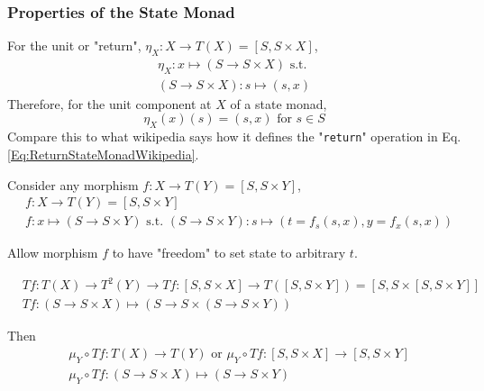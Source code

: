 \documentclass[10pt]{amsart}
\begin{document}
\begin{multicols*}{2}
\subsubsection{Properties of the State Monad}

For the unit or "return", $\eta_X : X \to T(X) = [S, S \times X]$, \\
\begin{equation}
\begin{gathered} 
\eta_X : x \mapsto (S \to S \times X) \text{ s.t. } \\
(S \to S \times X) : s \mapsto (s, x)
\end{gathered} 
\end{equation}
Therefore, for the unit component at $X$ of a state monad,
\begin{equation}
\boxed{ \eta_X(x)(s) = (s, x) \text{ for } s \in S }
\end{equation}
Compare this to what wikipedia says how it defines the "\texttt{return}" operation in Eq. \ref{Eq:ReturnStateMonadWikipedia}.

Consider any morphism $f : X \to T(Y) = [S, S\times Y]$,
\begin{equation}
\begin{aligned}
& f : X \to T(Y) = [S, S\times Y] \\
& f:x \mapsto (S \to S\times Y) \text{ s.t. } (S \to S \times Y) : s \mapsto (t = f_s(s, x), y = f_x(s, x))
\end{aligned}
\end{equation}

Allow morphism $f$ to have "freedom" to set state to arbitrary $t$.

\begin{equation}
\begin{aligned}
& Tf:T(X) \to T^2(Y) \to Tf : [S, S\times X] \to T([S, S\times Y]) = [S, S \times [S, S\times Y]] \\
& Tf:(S \to S \times X) \mapsto (S \to S \times (S \to S \times Y))
\end{aligned}
\end{equation}

Then
\begin{equation}
\begin{aligned}
& \mu_Y \circ Tf : T(X) \to T(Y) \text{ or } \mu_Y \circ Tf : [S, S \times X] \to [S, S \times Y] \\ 
& \mu_Y \circ Tf: (S \to S \times X) \mapsto (S \to S \times Y)
\end{aligned}
\end{equation}


\end{multicols*}
\end{document}
